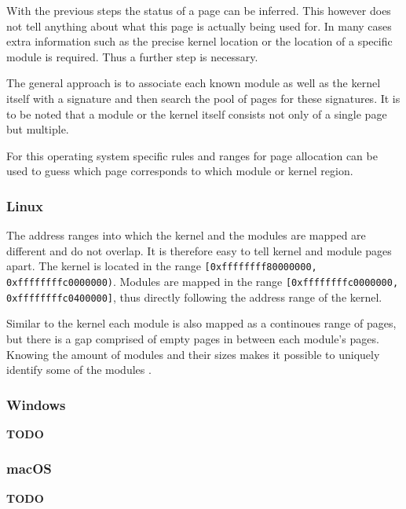 With the previous steps the status of a page can be inferred.
This however does not tell anything about what this page is actually being used for.
In many cases extra information such as the precise kernel location or the location of a specific module is required.
Thus a further step is necessary.

The general approach is to associate each known module as well as the kernel itself with a signature and then search the pool of pages for these signatures.
It is to be noted that a module or the kernel itself consists not only of a single page but multiple.

For this operating system specific rules and ranges for page allocation can be used to guess which page corresponds to which module or kernel region.

\subsubsection{Linux}

The address ranges into which the kernel and the modules are mapped are different and do not overlap.
It is therefore easy to tell kernel and module pages apart.
The kernel is located in the range \lstinline{[0xffffffff80000000, 0xffffffffc0000000)}.
Modules are mapped in the range \lstinline{[0xffffffffc0000000, 0xffffffffc0400000]}, thus directly following the address range of the kernel.

Similar to the kernel each module is also mapped as a continoues range of pages, but there is a gap comprised of empty pages in between each module's pages.
Knowing the amount of modules and their sizes makes it possible to uniquely identify some of the modules \cite{drk}.

\subsubsection{Windows}

\textbf{TODO}

\subsubsection{macOS}

\textbf{TODO}

